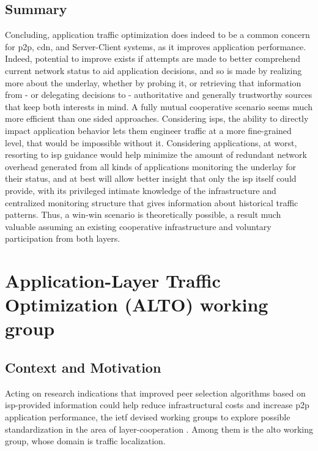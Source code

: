 \subsection{Summary}

    Concluding, application traffic optimization does indeed to be a common concern for \gls{p2p}, \gls{cdn}, and Server-Client systems, as it improves application performance.
    Indeed, potential to improve exists if attempts are made to better comprehend current network status to aid application decisions, and so is made by realizing more about the underlay, whether by probing it, or retrieving that information from - or delegating decisions to - authoritative and generally trustworthy sources that keep both interests in mind.
    A fully mutual cooperative scenario seems much more efficient than one sided approaches.
    Considering \glspl{isp}, the ability to directly impact application behavior lets them engineer traffic at a more fine-grained level, that would be impossible without it.
    Considering applications, at worst, resorting to \gls{isp} guidance would help minimize the amount of redundant network overhead generated from all kinds of applications monitoring the underlay for their status, and at best will allow better insight that only the \gls{isp} itself could provide, with its privileged intimate knowledge of the infrastructure and centralized monitoring structure that gives information about historical traffic patterns.
    Thus, a win-win scenario is theoretically possible, a result much valuable assuming an existing cooperative infrastructure and voluntary participation from both layers.

\section{Application-Layer Traffic Optimization (ALTO) working group}

\label{sec:state-alto}

\subsection{Context and Motivation}

    Acting on research indications that improved peer selection algorithms based on \gls{isp}-provided information could help reduce infrastructural costs and increase \gls{p2p} application performance, the \gls{ietf} devised working groups to explore possible standardization in the area of layer-cooperation \cite{seedorf2009}.
    Among them is the \gls{alto} working group, whose domain is traffic localization.

